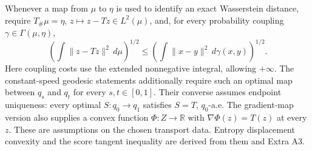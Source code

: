 \documentclass[11pt,a4paper]{report}
\begin{document}
Whenever a map from \(\mu\) to \(\eta\) is used to identify an exact Wasserstein distance, require \(T_\#\mu=\eta\), \(z\mapsto z-Tz\in L^2(\mu)\), and, for every probability coupling \(\gamma\in\Gamma(\mu,\eta)\),
        \[\left(\int\|z-Tz\|^2\,d\mu\right)^{1/2}
          \le\left(\int\|x-y\|^2\,d\gamma(x,y)\right)^{1/2}.\]
        Here coupling costs use the extended nonnegative integral, allowing \(+\infty\). The constant-speed geodesic statements additionally require such an optimal map between \(q_s\) and \(q_t\) for every \(s,t\in[0,1]\). Their converse assumes endpoint uniqueness: every optimal \(S:q_0\to q_1\) satisfies \(S=T\), \(q_0\)-a.e. The gradient-map version also supplies a convex function \(\Phi:Z\to\mathbb R\) with \(\nabla\Phi(z)=T(z)\) at every \(z\). These are assumptions on the chosen transport data. Entropy displacement convexity and the score tangent inequality are derived from them and Extra A3.
\end{document}
